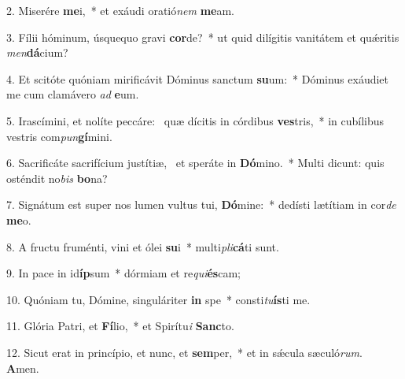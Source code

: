 2. Miserére \textbf{me}i,~*  et exáudi oratió\textit{nem} \textbf{me}am.\

3. Fílii hóminum, úsquequo gravi \textbf{cor}de?~*  ut quid dilígitis vanitátem et quǽritis \textit{men}\textbf{dá}cium?\

4. Et scitóte quóniam mirificávit Dóminus sanctum \textbf{su}um:~*  Dóminus exáudiet me cum clamávero \textit{ad} \textbf{e}um.\

5. Irascímini, et nolíte peccáre: \dag\  quæ dícitis in córdibus \textbf{ves}tris,~*  in cubílibus vestris com\textit{pun}\textbf{gí}mini.\

6. Sacrificáte sacrifícium justítiæ, \dag\  et speráte in \textbf{Dó}mino.~*  Multi dicunt: quis osténdit no\textit{bis} \textbf{bo}na?\

7. Signátum est super nos lumen vultus tui, \textbf{Dó}mine:~*  dedísti lætítiam in cor\textit{de} \textbf{me}o.\

8. A fructu fruménti, vini et ólei \textbf{su}i~*  multi\textit{pli}\textbf{cá}ti sunt.\

9. In pace in id\textbf{íp}sum~*  dórmiam et re\textit{qui}\textbf{és}cam;\

10. Quóniam tu, Dómine, singuláriter \textbf{in} spe~*  consti\textit{tu}\textbf{ís}ti me.\

11. Glória Patri, et \textbf{Fí}lio,~*  et Spirítu\textit{i} \textbf{Sanc}to.\

12. Sicut erat in princípio, et nunc, et \textbf{sem}per,~*  et in sǽcula sæculó\textit{rum}. \textbf{A}men.\

